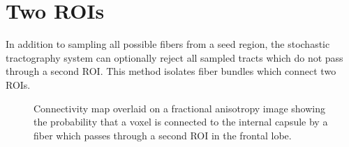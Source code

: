 \section{Two ROIs}

In addition to sampling all possible fibers from a seed region, the stochastic tractography system can optionally reject all sampled tracts which do not pass through a second ROI.  This method isolates fiber bundles which connect two ROIs.  
\begin{figure}
  \center
	\caption{Connectivity map overlaid on a fractional anisotropy image showing the probability that a voxel is connected to the internal capsule by a fiber which passes through a second ROI in the frontal lobe.}
\label{fig:twocmaps}
\end{figure}

